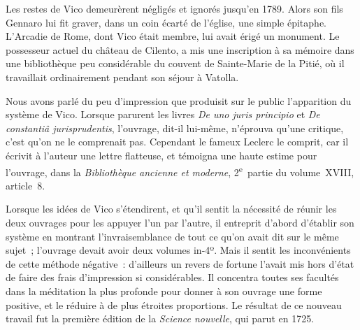 \documentclass[french,twoside]{book} %
\begin{document}
Les restes de Vico demeurèrent négligés et ignorés jusqu’en 1789. Alors son fils Gennaro lui fit graver, dans un coin écarté de l’église, une simple épitaphe. L’Arcadie de Rome, dont Vico était membre, lui avait érigé un monument. Le possesseur actuel du château de Cilento, a mis une inscription à sa mémoire dans une bibliothèque peu considérable du couvent de Sainte-Marie de la Pitié, où il travaillait ordinairement pendant son séjour à Vatolla.\par
\par
Nous avons parlé du peu d’impression que produisit sur le public l’apparition du système de Vico. Lorsque parurent les livres {\itshape De uno juris principio} et {\itshape De constantiâ jurisprudentis}, l’ouvrage, dit-il lui-même, n’éprouva qu’une critique, c’est qu’on ne le comprenait pas. Cependant le fameux Leclerc le comprit, car il écrivit à l’auteur une lettre flatteuse, et témoigna une haute estime pour l’ouvrage, dans la {\itshape Bibliothèque ancienne et moderne}, 2\textsuperscript{e} partie du volume XVIII, article 8.\par
Lorsque les idées de Vico s’étendirent, et qu’il sentit la nécessité de réunir les deux ouvrages pour les appuyer l’un par l’autre, il entreprit d’abord d’établir son système en montrant l’invraisemblance de tout ce qu’on avait dit sur le même sujet ; l’ouvrage devait avoir deux volumes in-4º. Mais il sentit les inconvénients de cette méthode négative : d’ailleurs un revers de fortune l’avait mis hors d’état de faire des frais d’impression si considérables. Il concentra toutes ses facultés dans la méditation la plus profonde pour donner à son ouvrage une forme positive, et le réduire à de plus étroites proportions. Le résultat de ce nouveau travail fut la première édition de la {\itshape Science nouvelle}, qui parut en 1725.\par
\end{document}
